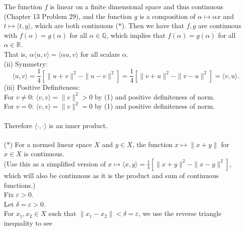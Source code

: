\begin{enumerate}
    The function $f$ is linear on a finite dimensional space and thus continuous (Chapter 13 Problem 29), and the function $g$ is a composition of $\alpha\mapsto\alpha x$ and $t\mapsto\langle t,y\rangle$, which are both continuous ($\ast$).
    Then we have that $f,g$ are continuous with $f(\alpha)=g(\alpha)$ for all $\alpha\in\mathbb{Q}$, which implies that $f(\alpha)=g(\alpha)$ for all $\alpha\in\mathbb{R}$.
    \\That is, $\alpha\langle u,v\rangle=\langle \alpha u,v\rangle$ for all scalars $\alpha$.
    \\(ii) Symmetry:
    \[\langle u,v \rangle = \frac{1}{4}[\|u+v\|^2-\|u-v\|^2]=\frac{1}{4}[\|v+u\|^2-\|v-u\|^2]=\langle v,u\rangle.\]
    (iii) Positive Definiteness:
    \\For $v\neq0$: $\langle v,v \rangle = \|v\|^2>0$ by (1) and positive definiteness of norm.
    \\For $v=0$: $\langle v,v \rangle = \|v\|^2=0$ by (1) and positive definiteness of norm.\\
    \\Therefore $\langle\cdot,\cdot\rangle$ is an inner product.\\
    \\($\ast$) For a normed linear space $X$ and $y\in X$, the function $x\mapsto\|x+y\|$ for $x\in X$ is continuous.
    \\(Use this as a simplified version of $x\mapsto\langle x,y\rangle=\frac{1}{4}[\|x+y\|^2-\|x-y\|^2]$, which will also be continuous as it is the product and sum of continuous functions.)
    \\Fix $\varepsilon>0$.
    \\Let $\delta=\varepsilon>0$.
    \\For $x_1,x_2\in X$ such that $\|x_1-x_2\|<\delta=\varepsilon$, we use the reverse triangle inequality to see

\end{enumerate}
